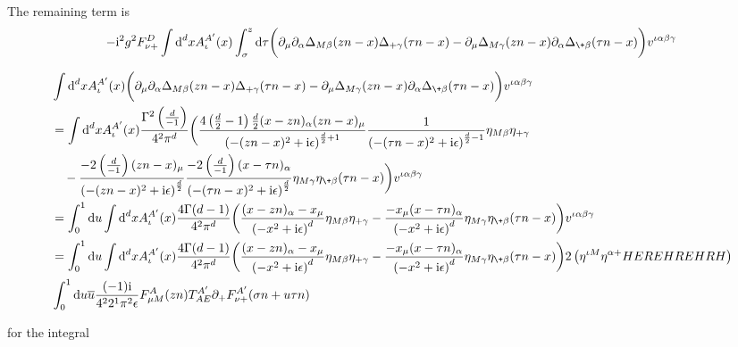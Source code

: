The remaining term is 
\begin{align}
	-\imag^2 g^2 \ft_{\nu +} ^D\int \ddx x A_\iota^{A'}(x) \int ^z_\sigma \dx \tau \bigg( \partial_\mu \partial_\alpha \propagator_{M\beta}(zn-x) \propagator_{+\gamma} (\tau n - x) - \partial_\mu \propagator_{M\gamma}(zn-x) \partial_\alpha\propagator_{\+\beta}(\tau n -x)\bigg)  v^{\iota \alpha\beta\gamma}
\end{align}

\begin{align}
	&\int \ddx x  A_\iota^{A'}(x) \bigg( \partial_\mu \partial_\alpha \propagator_{M\beta}(zn-x) \propagator_{+\gamma} (\tau n - x) - \partial_\mu \propagator_{M\gamma}(zn-x) \partial_\alpha\propagator_{\+\beta}(\tau n -x)\bigg)  v^{\iota \alpha\beta\gamma}
	\\
	&=
	\int \ddx x  A_\iota^{A'}(x) \frac{\Gamma^2\left(\frac{d}{-1}\right)}{4^2\pi^{d}}\bigg( \frac{4\left(\frac{d}{2}-1\right)\frac{d}{2}(x-zn)_\alpha (zn-x)_\mu}{\left(-(zn-x)^2+\imag \epsilon\right)^{\frac{d}{2}+1}}\frac{1}{\left(-(\tau n-x)^2+\imag \epsilon\right)^{\frac{d}{2}-1}}\metric_{M\beta}\metric_{+\gamma} 
	\nl
	- \frac{-2\left(\frac{d}{-1}\right)(zn-x)_\mu}{\left(-(zn-x)^2+\imag \epsilon\right)^{\frac{d}{2}}}\frac{-2\left(\frac{d}{-1}\right)(x- \tau n)_\alpha}{\left(-(\tau n-x)^2+\imag \epsilon\right)^{\frac{d}{2}}}\metric_{M\gamma}\metric_{\+\beta}(\tau n -x)\bigg)  v^{\iota \alpha\beta\gamma}
	\\
	&=
	\int _0^1 \dx u \int \ddx x  A_\iota^{A'}(x) \frac{4\Gamma(d-1)}{4^2\pi^{d}}\bigg( \frac{(x-zn)_\alpha-x_\mu}{\left(-x^2+\imag \epsilon\right)^{d}}\metric_{M\beta}\metric_{+\gamma} 
	-\frac{-x_\mu(x- \tau n)_\alpha}{\left(-x^2+\imag \epsilon\right)^{d}}\metric_{M\gamma}\metric_{\+\beta}(\tau n -x)\bigg)  v^{\iota \alpha\beta\gamma}
	\\
	&=
	\int _0^1 \dx u \int \ddx x  A_\iota^{A'}(x) \frac{4\Gamma(d-1)}{4^2\pi^{d}}\bigg( \frac{(x-zn)_\alpha-x_\mu}{\left(-x^2+\imag \epsilon\right)^{d}}\metric_{M\beta}\metric_{+\gamma} 
	-\frac{-x_\mu(x- \tau n)_\alpha}{\left(-x^2+\imag \epsilon\right)^{d}}\metric_{M\gamma}\metric_{\+\beta}(\tau n -x)\bigg)  2\left(\metric^{\iota M } \metric^{\alpha +}  HEREHREHRH\right) 
	\\
	&\int_0^1 \dx u \overline u\frac{(-1)\imag}{4^2 2^1\pi^2\epsilon}F_{\mu M}^{A}(zn)T^{A'}_{AE}\partial_+\ft_{\nu +}^{A'}(\sigma n +  u \tau n)
\end{align}

for the integral 

\ifdefined\mainprogram{}
\else

\fi